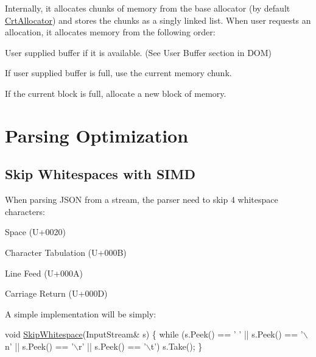 Internally, it allocates chunks of memory from the base allocator (by default {\ttfamily \hyperlink{class_crt_allocator}{Crt\+Allocator}}) and stores the chunks as a singly linked list. When user requests an allocation, it allocates memory from the following order\+:


\begin{DoxyEnumerate}
\item User supplied buffer if it is available. (See User Buffer section in D\+OM)
\item If user supplied buffer is full, use the current memory chunk.
\item If the current block is full, allocate a new block of memory.
\end{DoxyEnumerate}\hypertarget{md_Commun_Externe_RapidJSON_doc_internals_ParsingOptimization}{}\section{Parsing Optimization}\label{md_Commun_Externe_RapidJSON_doc_internals_ParsingOptimization}
\hypertarget{md_Commun_Externe_RapidJSON_doc_internals_SkipwhitespaceWithSIMD}{}\subsection{Skip Whitespaces with S\+I\+MD}\label{md_Commun_Externe_RapidJSON_doc_internals_SkipwhitespaceWithSIMD}
When parsing J\+S\+ON from a stream, the parser need to skip 4 whitespace characters\+:


\begin{DoxyEnumerate}
\item Space ({\ttfamily U+0020})
\item Character Tabulation ({\ttfamily U+000B})
\item Line Feed ({\ttfamily U+000A})
\item Carriage Return ({\ttfamily U+000D})
\end{DoxyEnumerate}

A simple implementation will be simply\+: 
\begin{DoxyCode}
\textcolor{keywordtype}{void} \hyperlink{reader_8h_a60338858b2582eca23f3e509a2d82e0e}{SkipWhitespace}(InputStream& s) \{
    \textcolor{keywordflow}{while} (s.Peek() == \textcolor{charliteral}{' '} || s.Peek() == \textcolor{charliteral}{'\(\backslash\)n'} || s.Peek() == \textcolor{charliteral}{'\(\backslash\)r'} || s.Peek() == \textcolor{charliteral}{'\(\backslash\)t'})
        s.Take();
\}
\end{DoxyCode}


